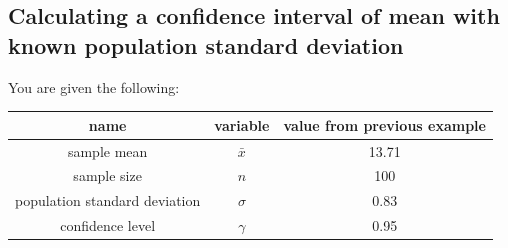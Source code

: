 \documentclass[12pt,letterpaper]{article}
\begin{document}
\newpage
\subsection*{Calculating a confidence interval of mean with known population standard deviation}
You are given the following:

\begin{tabular}{|c|c|c|}\hline
name & variable & value from previous example \\ \hline
sample mean & $\bar{x}$ & 13.71 \\
sample size & $n$ & 100 \\
population standard deviation & $\sigma$ & 0.83 \\
confidence level & $\gamma$ & 0.95 \\ \hline
\end{tabular}\\

\vspace{20pt}
\end{document}
